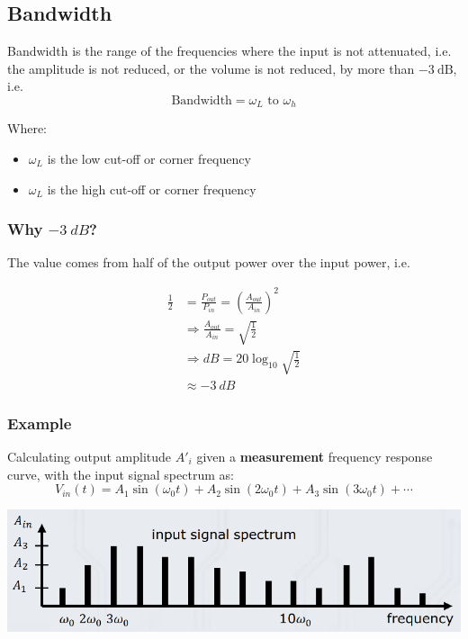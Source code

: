 \documentclass[11pt]{article}
\begin{document}
\subsection{Bandwidth}
\label{sec:orga4b8445}
Bandwidth is the range of the frequencies where the input is not attenuated, i.e. the amplitude is not reduced, or the volume is not reduced, by more than \(\qty{-3}{\dB}\), i.e.
\[\text{Bandwidth} = \omega_L \text{ to } \omega_h\]

Where:
\begin{itemize}
\item \(\omega_L\) is the low cut-off or corner frequency
\item \(\omega_L\) is the high cut-off or corner frequency
\end{itemize}

 \newpage
\subsubsection{Why \(\qty{-3}{dB}\)?}
\label{sec:org98dc32c}
The value comes from half of the output power over the input power, i.e.

\begin{align*}
\frac{1}{2} &= \frac{P_{out}}{P_{in}} = \left(\frac{A_{out}}{A_{in}} \right)^2 \\
& \Rightarrow \frac{A_{out}}{A_{in}} = \sqrt{\frac{1}{2}} \\
& \Rightarrow \unit{dB} = 20 \log_{10} \sqrt{\frac{1}{2}} \\
& \approx \qty{-3}{dB}
\end{align*}
\subsubsection{Example}
\label{sec:org010cad0}
Calculating output amplitude \(A'_i\) given a \textbf{measurement} frequency response curve, with the input signal spectrum as:
\[V_{in} (t) = A_1 \sin (\omega_0 t) + A_2 \sin (2 \omega_0 t) + A_3 \sin (3 \omega_0 t) + \cdots\]

\begin{center}
\includegraphics[width=.9\linewidth]{./images/bandwidth-example-input-signal-spectrum.png}
\end{center}
\end{document}
